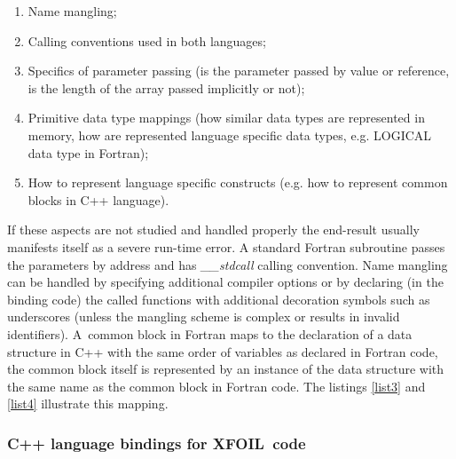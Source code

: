 \begin{enumerate}[topsep=5pt, partopsep=0pt,itemsep=3pt,parsep=1pt]
\item Name mangling;
\item Calling conventions used in both languages;
\item Specifics of parameter passing (is the parameter passed by value or
reference, is the length of the array passed implicitly or not);
\item Primitive data type mappings (how similar data types are represented
in memory, how are represented language specific data types, e.g. LOGICAL
data type in Fortran);
\item How to represent language specific constructs (e.g. how to represent
common blocks in C++ language).
\end{enumerate}

If these aspects are not studied and handled properly the end-result usually
manifests itself as a severe run-time error. A standard Fortran subroutine
passes the parameters by address and has \textit{\_\_stdcall} calling
convention. Name mangling can be handled by specifying additional compiler
options or by declaring (in the binding code) the called functions with
additional decoration symbols such as underscores (unless the mangling
scheme is complex or results in invalid identifiers). A\ common block in
Fortran maps to the declaration of a data structure in C++ with the same
order of variables as declared in Fortran code, the common block itself is
represented by an instance of the data structure with the same name as the
common block in Fortran code. The listings \ref{list3} and \ref{list4} illustrate this
mapping.





\subsubsection{C++ language bindings for XFOIL\ code}

